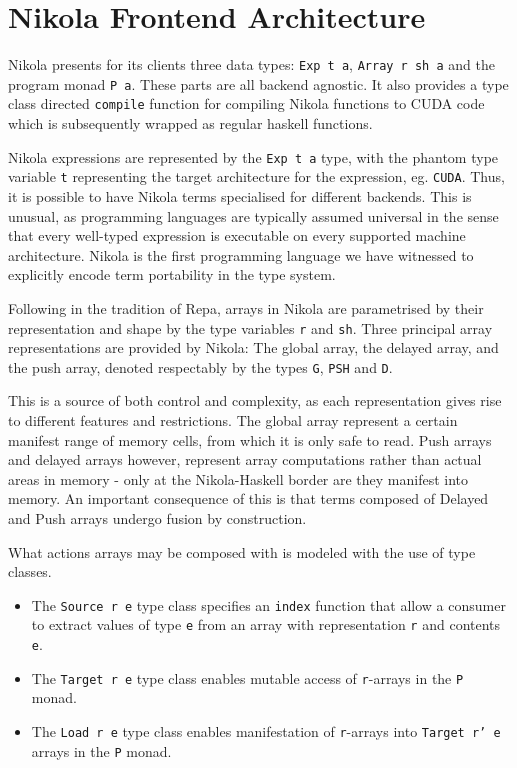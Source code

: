 \section{Nikola Frontend Architecture}



Nikola presents for its clients three data types: \texttt{Exp t a},
\texttt{Array r sh a} and the program monad \texttt{P a}. These parts are all
backend agnostic. It also provides a type class directed \texttt{compile}
function for compiling Nikola functions to CUDA code which is subsequently
wrapped as regular haskell functions.

Nikola expressions are represented by the \texttt{Exp t a} type, with the
phantom type variable \texttt{t} representing the target architecture for the
expression, eg.  \texttt{CUDA}. Thus, it is possible to have Nikola terms
specialised for different backends. This is unusual, as programming languages
are typically assumed universal in the sense that every well-typed expression
is executable on every supported machine architecture. Nikola is the first
programming language we have witnessed to explicitly encode term portability in
the type system.

Following in the tradition of Repa, arrays in Nikola are parametrised by their
representation and shape by the type variables \texttt{r} and \texttt{sh}.
Three principal array representations are provided by Nikola: The global array,
the delayed array, and the push array, denoted respectably by the types
\texttt{G}, \texttt{PSH} and \texttt{D}. 

This is a source of both control and complexity, as each representation gives
rise to different features and restrictions. The global array represent a certain
manifest range of memory cells, from which it is only safe to read. Push arrays
and delayed arrays however, represent array computations rather than actual
areas in memory - only at the Nikola-Haskell border are they manifest into
memory. An important consequence of this is that terms composed of Delayed and
Push arrays undergo fusion by construction.

What actions arrays may be composed with is modeled with the use of type
classes. 
\begin{itemize}
\item The \texttt{Source r e} type class specifies an \texttt{index}
function that allow a consumer to extract values of type \texttt{e} from an
array with representation \texttt{r} and contents \texttt{e}.
\item The \texttt{Target r e} type class enables mutable access of \texttt{r}-arrays in the \texttt{P} monad.
\item The \texttt{Load r e} type class enables manifestation of \texttt{r}-arrays into
\texttt{Target r' e} arrays in the \texttt{P} monad.
\end{itemize}


